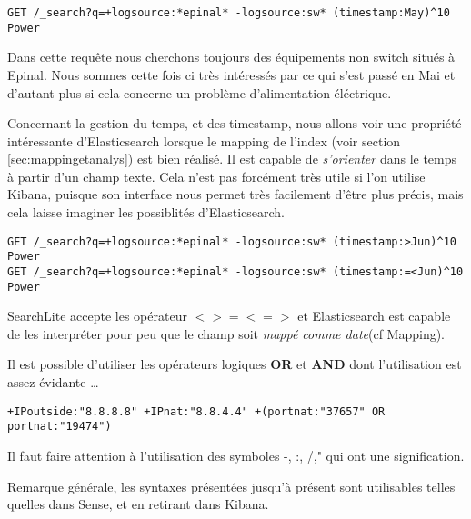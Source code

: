 {\begin{lstlisting}[style=code,label={lst:APIsearchliteexample4},caption={Modifier la pertinence}]
GET /_search?q=+logsource:*epinal* -logsource:sw* (timestamp:May)^10 Power
\end{lstlisting}
Dans cette requête nous cherchons toujours des équipements non switch situés à Epinal.
Nous sommes cette fois ci très intéressés par ce qui s'est passé en Mai et d'autant
plus si cela concerne un problème d'alimentation éléctrique.

Concernant la gestion du temps, et des timestamp, nous allons voir une propriété 
intéressante d'Elasticsearch lorsque le mapping  de l'index (voir section \ref{sec:mappingetanalys}) est bien réalisé.
Il est capable de \textit{s'orienter} dans le temps à partir d'un champ texte.
Cela n'est pas forcément très utile si l'on utilise Kibana, puisque son interface
nous permet très facilement d'être plus précis, mais cela laisse imaginer les possiblités
d'Elasticsearch.


\begin{lstlisting}[style=code,label={lst:APIsearchliteexample5},caption={Le temps dans SearchLite}]
GET /_search?q=+logsource:*epinal* -logsource:sw* (timestamp:>Jun)^10 Power
GET /_search?q=+logsource:*epinal* -logsource:sw* (timestamp:=<Jun)^10 Power
\end{lstlisting}

SearchLite accepte les opérateur $< > =< =>$ et Elasticsearch est capable de les 
interpréter pour peu que le champ soit \textit{mappé comme date}(cf Mapping).

Il est possible d'utiliser les opérateurs logiques \textbf{OR} et \textbf{AND} 
dont l'utilisation est assez évidante \ldots
\begin{lstlisting}[style=code,label={lst:APIsearchliteexample6},caption={Opérateurs logiques}]
+IPoutside:"8.8.8.8" +IPnat:"8.8.4.4" +(portnat:"37657" OR portnat:"19474")
\end{lstlisting}

Il faut faire attention à l'utilisation des symboles -, :, /," qui ont une signification.


Remarque générale, les syntaxes présentées jusqu'à présent sont utilisables telles
quelles dans Sense, et en retirant  dans Kibana.



}
